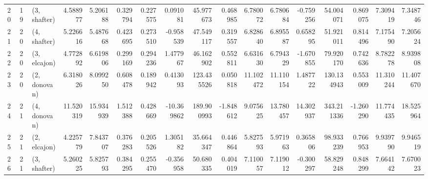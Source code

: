 \begin{tabular}{lllrrrrrrrrrrrrrr}
20 &    19 &  (3, shafter) &   4.588977 &   5.206188 &   0.329794 &  0.227575 &   0.091081 &   45.977673 &  0.468985 &   6.780072 &   6.780684 &  -0.759256 &   54.004071 &  0.869075 &   7.309419 &   7.348746 \\
21 &    20 &  (4, shafter) &   5.226616 &   5.487668 &   0.423695 &  0.273510 &  -0.958539 &   47.549117 &  0.319557 &   6.828640 &   6.895587 &   0.658295 &   51.921011 &  0.814496 &   7.175490 &   7.205624 \\
22 &    20 &  (3, elcajon) &   4.772892 &   6.619806 &   0.299169 &  0.294236 &   1.477967 &   46.162902 &  0.552811 &   6.631630 &   6.794329 &  -1.670855 &   79.920170 &  0.742636 &   8.782278 &   8.939808 \\
23 &    20 &  (2, donovan) &   6.318026 &   8.099250 &   0.608478 &  0.189942 &   0.413093 &  123.435526 &  0.050818 &  11.102472 &  11.110154 &   1.487722 &  130.134943 &  0.553009 &  11.310244 &  11.407670 \\
24 &    21 &  (4, donovan) &  11.520319 &  15.934939 &   1.512388 &  0.428669 & -10.369862 &  189.900993 & -1.848612 &   9.075625 &  13.780457 &  14.302937 &  343.211336 & -1.260290 &  11.774435 &  18.525964 \\
25 &    21 &  (2, elcajon) &   4.225779 &   7.843707 &   0.376283 &  0.205526 &   1.305182 &   35.664347 &  0.446864 &   5.827593 &   5.971963 &   0.365806 &   98.933239 &  0.766953 &   9.939790 &   9.946519 \\
26 &    21 &  (3, shafter) &   5.260225 &   5.825793 &   0.384295 &  0.255470 &  -0.356958 &   50.680335 &  0.404019 &   7.110057 &   7.119012 &  -0.300297 &   58.829248 &  0.848299 &   7.664142 &   7.670023 \\
\bottomrule
\end{tabular}
